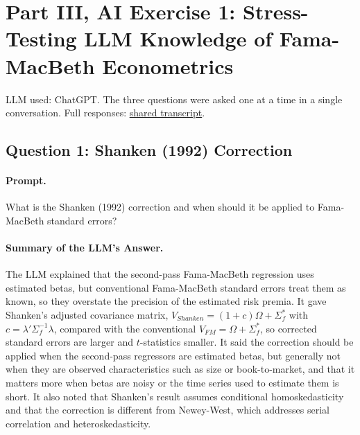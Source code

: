 \section{Part III, AI Exercise 1: Stress-Testing LLM Knowledge of
Fama-MacBeth Econometrics}

LLM used: ChatGPT. The three questions were asked one at a time in a single
conversation. Full responses:
\href{https://chatgpt.com/share/6ab8a8ae-5c10-83ea-a8ee-345b18c411cf}{shared transcript}.

\subsection{Question 1: Shanken (1992) Correction}

\paragraph{Prompt.} What is the Shanken (1992) correction and when should it be
applied to Fama-MacBeth standard errors?

\paragraph{Summary of the LLM's Answer.} The LLM explained that the second-pass
Fama-MacBeth regression uses estimated betas, but conventional Fama-MacBeth
standard errors treat them as known, so they overstate the precision of the
estimated risk premia. It gave Shanken's adjusted covariance matrix,
$V_{Shanken} = (1+c)\Omega + \Sigma_f^*$ with $c = \lambda'\Sigma_f^{-1}\lambda$,
compared with the conventional $V_{FM} = \Omega + \Sigma_f^*$, so corrected
standard errors are larger and $t$-statistics smaller. It said the correction
should be applied when the second-pass regressors are estimated betas, but
generally not when they are observed characteristics such as size or
book-to-market, and that it matters more when betas are noisy or the time series
used to estimate them is short. It also noted that Shanken's result assumes
conditional homoskedasticity and that the correction is different from
Newey-West, which addresses serial correlation and heteroskedasticity.

